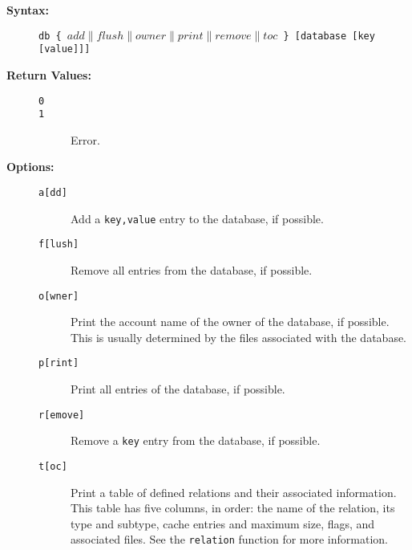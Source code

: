 \begin{description}
\item[{\bf Syntax:}] \mbox{}

{\tt db \{ $add\|flush\|owner\|print\|remove\|toc$ \} {[database [key [value]]]}}



\item[{\bf Return Values:}] \mbox{}

\begin{description}
\item[{\tt 0}] \mbox{}



\item[{\tt 1}] \mbox{}

Error.

\end{description}


\item[{\bf Options:}] \mbox{}

\begin{description}
\item[{\tt {a[dd]}}] \mbox{}

Add a {\tt key,value} 
entry to the database, if possible.

\item[{\tt {f[lush]}}] \mbox{}

Remove all entries from the database, 
if possible.

\item[{\tt {o[wner]}}] \mbox{}

Print the account name of the owner 
of the database, if possible. This is usually determined by the 
files associated with the database.

\item[{\tt {p[rint]}}] \mbox{}

Print all entries of the database, 
if possible. 

\item[{\tt {r[emove]}}] \mbox{}

Remove a {\tt key} entry 
from the database, if possible.

\item[{\tt {t[oc]}}] \mbox{}

Print a table of defined relations 
and their associated information. This table has five columns, 
in order: the name of the relation, its type and subtype, cache 
entries and maximum size, flags, and associated files. See the 
{\tt relation} function for more information.


\end{description}
\end{description}
